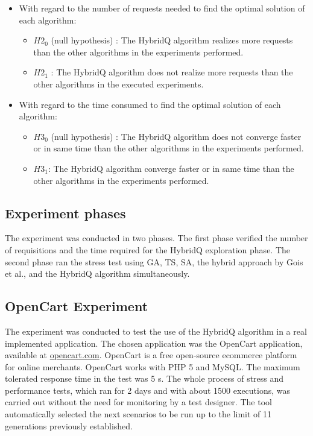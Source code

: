 \documentclass{bmcart}
\begin{document}
\begin{itemize}
\item With regard to the number of requests needed to find the optimal solution of each algorithm:
\begin{itemize}
\item $H2_{0}$ (null hypothesis) : The HybridQ algorithm realizes more requests than the other algorithms in the experiments performed.
\item $H2_{1}$  : The HybridQ algorithm does not realize more requests than the other algorithms in the executed experiments. 
\end{itemize}
\end{itemize}


\begin{itemize}
\item With regard to the time consumed to find the optimal solution of each algorithm:
\begin{itemize}
\item $H3_{0}$ (null hypothesis) :  The HybridQ algorithm does not converge faster or in same time than the other algorithms in the experiments performed. 
\item $H3_{1}$: The HybridQ algorithm converge faster or in same time than the other algorithms in the experiments performed. 
\end{itemize}
\end{itemize}

\subsection{Experiment phases}

The experiment was conducted in two phases. The first phase verified the number of requisitions and the time required for the HybridQ exploration phase. The second phase ran the stress test using GA, TS, SA, the hybrid approach by Gois et al., and the HybridQ algorithm simultaneously.

\subsection{OpenCart Experiment}

The experiment was conducted to test the use of the HybridQ algorithm in a real implemented application.  The chosen application was the OpenCart application, available at \url{opencart.com}. OpenCart is a free open-source ecommerce platform for online merchants. OpenCart works with PHP 5 and MySQL. The maximum tolerated response time in the test was 5 s. The whole process of stress and performance tests, which ran for 2 days and  with about 1500 executions, was carried out without the need for monitoring by a test designer. The tool automatically selected the next scenarios to be run up to the limit of 11 generations previously established. 
\end{document}
